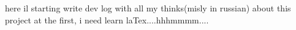 here il starting write dev log with all my thinks(misly in russian) about this project
at the first, i need learn laTex....hhhmmmm....

